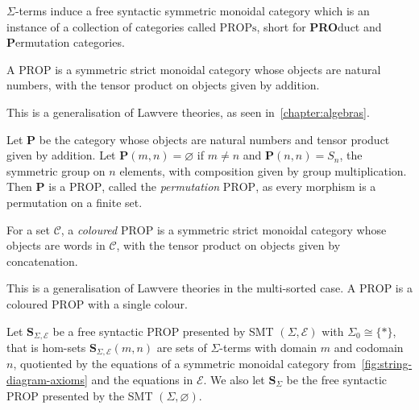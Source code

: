 $\Sigma$-terms induce a free syntactic symmetric monoidal category which is an instance of a collection of categories called $\mathrm{PROPs}$, short for \textbf{PRO}duct and \textbf{P}ermutation categories.
\begin{definition}
  A $\mathrm{PROP}$ is a symmetric strict monoidal category whose objects are natural numbers, with the tensor product on objects given by addition.
\end{definition}
This is a generalisation of Lawvere theories, as seen in~\cref{chapter:algebras}.

\begin{example}\label{example:initial_prop}
Let $\mathbf{P}$ be the category whose objects are natural numbers and tensor product given by addition.
Let $\mathbf{P}(m,n) = \varnothing$ if $m \neq n$ and $\mathbf{P}(n,n) = S_n$, the symmetric group on $n$ elements, with composition given by group multiplication.
Then $\mathbf{P}$ is a $\mathrm{PROP}$, called the \emph{permutation} $\mathrm{PROP}$, as every morphism is a permutation on a finite set.
\end{example}
\begin{definition}
\label{def:coloured-prop}
For a set $\mathcal{C}$, a \emph{coloured} $\mathrm{PROP}$ is a symmetric strict monoidal category whose objects are words in $\mathcal{C}$, with the tensor product on objects given by concatenation.
\end{definition}
This is a generalisation of Lawvere theories in the multi-sorted case.
A $\mathrm{PROP}$ is a coloured $\mathrm{PROP}$ with a single colour.

\begin{definition}
Let $\mathbf{S}_{\Sigma,\mathcal{E}}$ be a free syntactic PROP presented by SMT $(\Sigma, \mathcal{E})$ with $\Sigma_0 \cong \{*\}$, that is hom-sets $\mathbf{S}_{\Sigma,\mathcal{E}}(m,n)$ are sets of $\Sigma$-terms with domain $m$ and codomain $n$, quotiented by the equations of a symmetric monoidal category from~\cref{fig:string-diagram-axioms} and the equations in $\mathcal{E}$.
We also let $\mathbf{S}_{\Sigma}$ be the free syntactic PROP presented by the SMT $(\Sigma, \varnothing)$.
\end{definition}

